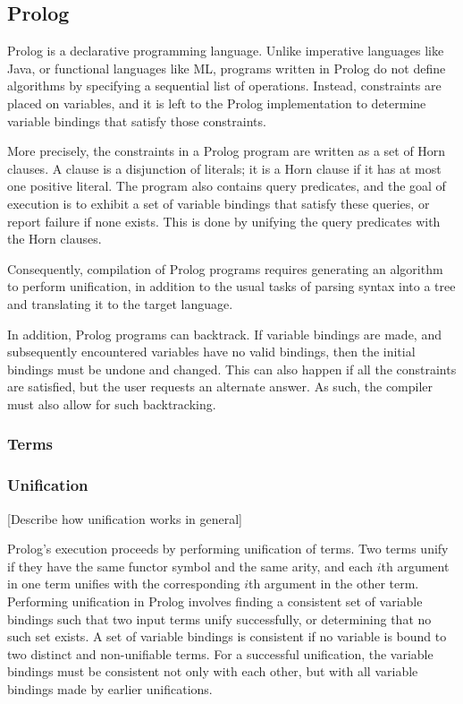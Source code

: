 \documentclass[12pt]{article}
\begin{document}
\subsection{Prolog}

Prolog is a declarative programming language. 
Unlike imperative languages like Java, or functional languages like ML, programs written in Prolog do not define algorithms by specifying a sequential list of operations. 
Instead, constraints are placed on variables, and it is left to the Prolog implementation to determine variable bindings that satisfy those constraints. 

More precisely, the constraints in a Prolog program are written as a set of Horn clauses. 
A clause is a disjunction of literals; it is a Horn clause if it has at most one positive literal. 
The program also contains query predicates, and the goal of execution is to exhibit a set of variable bindings that satisfy these queries, or report failure if none exists. 
This is done by unifying the query predicates with the Horn clauses.

Consequently, compilation of Prolog programs requires generating an algorithm to perform unification, in addition to the usual tasks of parsing syntax into a tree and translating it to the target language.

In addition, Prolog programs can backtrack. 
If variable bindings are made, and subsequently encountered variables have no valid bindings, then the initial bindings must be undone and changed. 
This can also happen if all the constraints are satisfied, but the user requests an alternate answer. 
As such, the compiler must also allow for such backtracking.

\subsubsection{Terms}

\subsubsection{Unification}

[Describe how unification works in general]

Prolog's execution proceeds by performing unification of terms. Two terms unify if they have the same functor symbol and the same arity, and each $i$th argument in one term unifies with the corresponding $i$th argument in the other term. Performing unification in Prolog involves finding a consistent set of variable bindings such that two input terms unify successfully, or determining that no such set exists. A set of variable bindings is consistent if no variable is bound to two distinct and non-unifiable terms. For a successful unification, the variable bindings must be consistent not only with each other, but with all variable bindings made by earlier unifications.
\end{document}
